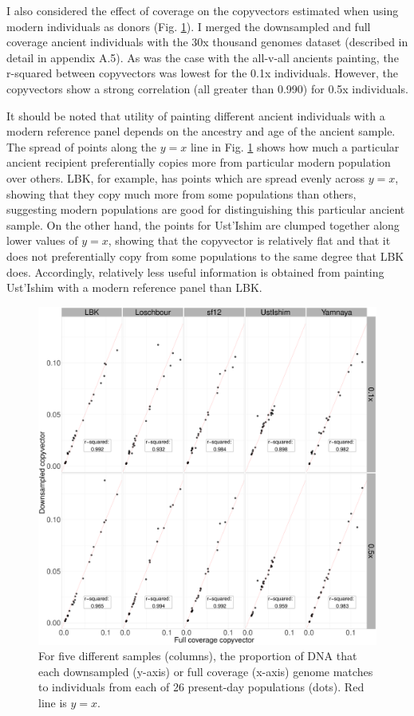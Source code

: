 I also considered the effect of coverage on the copyvectors estimated when using modern individuals as donors (Fig. \ref{fig:CP_correlation_allSamples_0.1x_0.5x_30x_moderns}). I merged the downsampled and full coverage ancient individuals with the 30x thousand genomes dataset (described in detail in appendix A.5). As was the case with the all-v-all ancients painting, the r-squared between copyvectors was lowest for the 0.1x individuals. However, the copyvectors show a strong correlation (all greater than 0.990) for 0.5x individuals. 

It should be noted that utility of painting different ancient individuals with a modern reference panel depends on the ancestry and age of the ancient sample. The spread of points along the $y=x$ line in Fig. \ref{fig:CP_correlation_allSamples_0.1x_0.5x_30x_moderns} shows how much a particular ancient recipient preferentially copies more from particular modern population over others. LBK, for example, has points which are spread evenly across $y=x$, showing that they copy much more from some populations than others, suggesting modern populations are good for distinguishing this particular ancient sample. On the other hand, the points for Ust'Ishim are clumped together along lower values of $y=x$, showing that the copyvector is relatively flat and that it does not preferentially copy from some populations to the same degree that LBK does. Accordingly, relatively less useful information is obtained from painting Ust'Ishim with a modern reference panel than LBK.

\begin{figure}[htp]
    \centering
    \includegraphics[width=1.0\textwidth]{../images/chapter1/CP_correlation_allSamples_0.1x_0.5x_30x_moderns.pdf}
    \caption{For five different samples (columns), the proportion of DNA that each downsampled (y-axis) or full coverage (x-axis) genome matches to individuals from each of 26 present-day populations (dots). Red line is $y=x$.}
    \label{fig:CP_correlation_allSamples_0.1x_0.5x_30x_moderns}
\end{figure}

